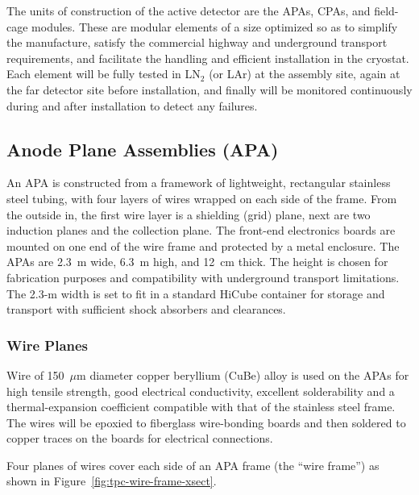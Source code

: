 The units of construction of the active detector are the APAs, CPAs,
and field-cage modules. These are modular elements of a size optimized
so as to simplify the manufacture, satisfy the commercial highway and
underground transport requirements, and facilitate the handling and 
efficient installation in the cryostat.  Each element will be fully
tested in LN$_2$ (or LAr) at the assembly site, again at the far
detector site before installation, and finally will be monitored
continuously during and after installation to detect any failures.


\subsection{Anode Plane Assemblies (APA)}
\label{subsec:fd-ref-apa}

An APA is constructed from a framework of
lightweight, rectangular stainless steel tubing, with four layers of
wires wrapped on each side of the frame.
From the outside in, the first wire layer is a shielding (grid) plane, next are
two induction planes and the collection plane. 
%
The front-end electronics
boards are mounted on one end of the wire  
frame and protected by a
metal enclosure.
The APAs are 2.3~m wide, 6.3~m high, and 12~cm thick. The height is
chosen for fabrication purposes and compatibility with underground
transport limitations. The 2.3-m width is set to fit in a standard
HiCube container 
for storage and transport with sufficient shock
absorbers and clearances.  


\subsubsection{Wire Planes}
\label{subsec:fd-ref-wireplanes}

Wire of 150~$\mu$m diameter copper beryllium (CuBe) alloy is used on the
APAs for high tensile strength, good electrical conductivity,
excellent solderability and a thermal-expansion coefficient
compatible with that of the stainless steel frame.  The wires will be
epoxied to fiberglass wire-bonding boards and then soldered to copper
traces on the boards for electrical connections.

Four planes of wires cover each side of an APA frame (the
``wire frame'')  as shown in Figure~\ref{fig:tpc-wire-frame-xsect}.

